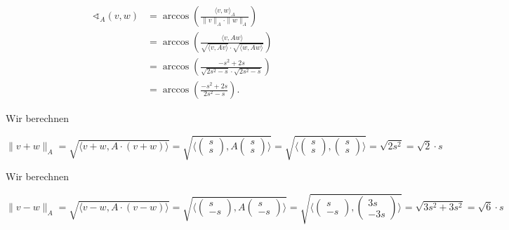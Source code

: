 \documentclass{article}
\begin{document}
 \[
\begin{aligned}
     \sphericalangle_A (v,w)
     &=
     \arccos \left( \frac{\langle v , w \rangle_A}
     {\| v\|_A \cdot \|w\|_A} \right)
    \\ &=
     \arccos \left( \frac{\langle v , Aw \rangle}
     {\sqrt{\langle v,Av \rangle} \cdot \sqrt{\langle w,Aw \rangle}} \right)
    \\ &=
     \arccos \left( \frac{ - s^2 + 2s}
     {\sqrt{2s^2 - s} \cdot \sqrt{2s^2 - s}} \right)
    \\ &=
     \arccos \left( \frac{ - s^2 + 2s}
     {2s^2 - s} \right).
\end{aligned}
 \]

Wir berechnen

 \[
     \| v + w\|_A 
    =
    \sqrt{\langle v + w,A \cdot (v + w)\rangle}
    =
    \sqrt{\langle\begin{pmatrix}
        s \\ s
    \end{pmatrix}, A \begin{pmatrix} 
        s \\ s
    \end{pmatrix} \rangle}
    =
    \sqrt{\langle\begin{pmatrix}
        s \\ s
    \end{pmatrix}, \begin{pmatrix} 
        s \\ s
    \end{pmatrix} \rangle}
    =
    \sqrt{2s^2}
    =
    \sqrt{2} \cdot s
 \]

Wir berechnen

 \[
     \| v - w\|_A 
    =
    \sqrt{\langle v - w,A \cdot (v - w)\rangle}
    =
    \sqrt{\langle\begin{pmatrix}
        s \\ -s
    \end{pmatrix}, A \begin{pmatrix} 
        s \\ -s
    \end{pmatrix} \rangle}
    =
    \sqrt{\langle\begin{pmatrix}
        s \\ -s
    \end{pmatrix}, \begin{pmatrix} 
        3s \\ - 3s
    \end{pmatrix} \rangle}
    =
    \sqrt{3s^2 + 3s^2}
    =
    \sqrt{6} \cdot s
 \]
\end{document}
